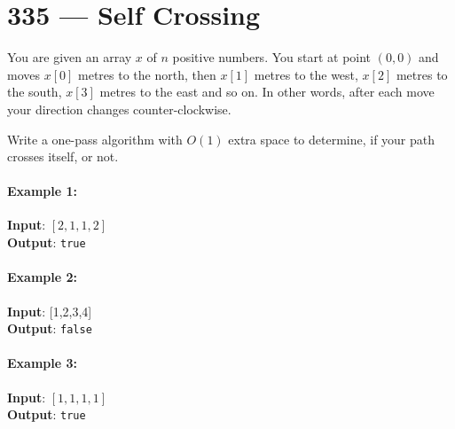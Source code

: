 \section{335 --- Self Crossing}
You are given an array $ x $ of $ n $ positive numbers. You start at point $ (0,0) $ and moves $ x[0] $ metres to the north, then $ x[1] $ metres to the west, $ x[2] $ metres to the south, $ x[3] $ metres to the east and so on. In other words, after each move your direction changes counter-clockwise.
\par
Write a one-pass algorithm with $ O(1) $ extra space to determine, if your path crosses itself, or not.

 

\paragraph{Example 1:}

\begin{flushleft}
\begin{figure}[H]
\end{figure}
\textbf{Input}: $ [2,1,1,2] $
\\
\textbf{Output}: \texttt{true}
\end{flushleft}

\paragraph{Example 2:}

\begin{flushleft}
\begin{figure}[H]
\end{figure}
\textbf{Input}: [1,2,3,4]
\\
\textbf{Output}: \texttt{false} 
\end{flushleft}

\paragraph{Example 3:}

\begin{flushleft}
\begin{figure}[H]
\end{figure}
\textbf{Input}: $ [1,1,1,1] $
\\
\textbf{Output}: \texttt{true} 
\end{flushleft}

